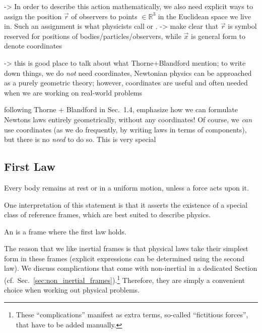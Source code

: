 \documentclass[../class_mech_main.tex]{subfiles}
\begin{document}
-> In order to describe this action mathematically, we also need explicit ways to assign the position $\vec{r}$ of observers to points $\in \mathbb{R}^3$ in the Euclidean space we live in. Such an assignment is what physicists call  or . -> make clear that $\vec{r}$ is symbol reserved for positions of bodies/particles/observers, while $\vec{x}$ is general form to denote coordinates

-> this is good place to talk about what Thorne+Blandford mention; to write down things, we do \emph{not} need coordinates, Newtonian physics can be approached as a purely geometric theory; however, coordinates are useful and often needed when we are working on real-world problems


following Thorne + Blandford in Sec.~1.4, emphasize how we can formulate Newtons laws entirely geometrically, without any coordinates! Of course, we \emph{can} use coordinates (as we do frequently, by writing laws in terms of components), but there is no \emph{need} to do so. This is very special



		\subsection{First Law}
\begin{axiom}
	\centering
	Every body remains at rest or in a uniform motion, unless a force acts upon it.
\end{axiom}
One interpretation of this statement is that it asserts the existence of a special class of reference frames, which are best suited to describe physics.
\begin{defi}
	An  is a frame where the first law holds.
\end{defi}

The reason that we like inertial frames is that physical laws take their simplest form in these frames (explicit expressions can be determined using the second law). We discuss complications that come with non-inertial in a dedicated Section (cf.~Sec.~\ref{sec:non_inertial_frames}).\footnote{These \enquote{complications} manifest as extra terms, so-called \enquote{fictitious forces}, that have to be added manually.} Therefore, they are simply a convenient choice when working out physical problems.
\end{document}
